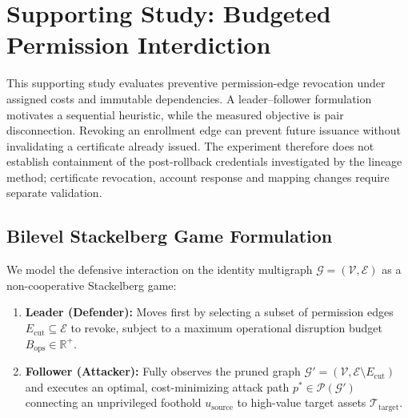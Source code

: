 \section{Supporting Study: Budgeted Permission Interdiction}
\label{sec:game_theoretic}

This supporting study evaluates preventive permission-edge revocation under assigned costs and immutable dependencies. A leader--follower formulation motivates a sequential heuristic, while the measured objective is pair disconnection. Revoking an enrollment edge can prevent future issuance without invalidating a certificate already issued. The experiment therefore does not establish containment of the post-rollback credentials investigated by the lineage method; certificate revocation, account response and mapping changes require separate validation.

\subsection{Bilevel Stackelberg Game Formulation}
We model the defensive interaction on the identity multigraph $\mathcal{G} = (\mathcal{V}, \mathcal{E})$ as a non-cooperative Stackelberg game:
\begin{enumerate}
    \item \textbf{Leader (Defender):} Moves first by selecting a subset of permission edges $E_{\text{cut}} \subseteq \mathcal{E}$ to revoke, subject to a maximum operational disruption budget $B_{\text{ops}} \in \mathbb{R}^+$.
    \item \textbf{Follower (Attacker):} Fully observes the pruned graph $\mathcal{G}' = (\mathcal{V}, \mathcal{E} \setminus E_{\text{cut}})$ and executes an optimal, cost-minimizing attack path $p^* \in \mathcal{P}(\mathcal{G}')$ connecting an unprivileged foothold $u_{\text{source}}$ to high-value target assets $\mathcal{T}_{\text{target}}$.
\end{enumerate}

